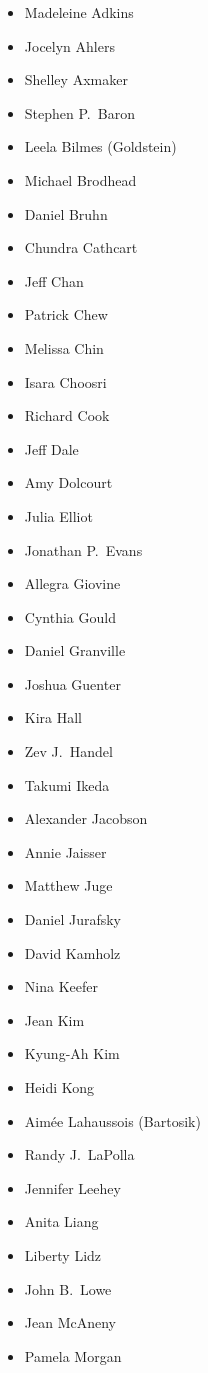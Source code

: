 \begin{multicols}{3}
\begin{itemize}
\item Madeleine Adkins
\item Jocelyn Ahlers
\item Shelley Axmaker
\item Stephen P.\ Baron
\item Leela Bilmes (Goldstein)
\item Michael Brodhead
\item Daniel Bruhn
\item Chundra Cathcart
\item Jeff Chan
\item Patrick Chew
\item Melissa Chin
\item Isara Choosri
\item Richard Cook
\item Jeff Dale
\item Amy Dolcourt
\item Julia Elliot
\item Jonathan P.\ Evans
\item Allegra Giovine
\item Cynthia Gould
\item Daniel Granville
\item Joshua Guenter
\item Kira Hall
\item Zev J.\ Handel
\item Takumi Ikeda
\item Alexander Jacobson
\item Annie Jaisser
\item Matthew Juge
\item Daniel Jurafsky
\item David Kamholz
\item Nina Keefer
\item Jean Kim
\item Kyung-Ah Kim
\item Heidi Kong
\item Aim\'ee Lahaussois (Bartosik)
\item Randy J.\ LaPolla
\item Jennifer Leehey
\item Anita Liang
\item Liberty Lidz
\item John B.\ Lowe
\item Jean McAneny
\item Pamela Morgan

\end{itemize}
\end{multicols}
